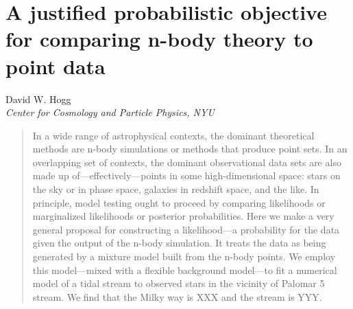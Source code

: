\documentclass[12pt,pdftex]{article}
\begin{document}
\section*{A justified probabilistic objective for comparing n-body theory to point data}

\noindent
David W. Hogg \\
\textsl{Center for Cosmology and Particle Physics, NYU}

\begin{abstract}
In a wide range of astrophysical contexts, the dominant theoretical
methods are n-body simulations or methods that produce point sets.  In
an overlapping set of contexts, the dominant observational data sets
are also made up of---effectively---points in some high-dimensional
space: stars on the sky or in phase space, galaxies in redshift space,
and the like.  In principle, model testing ought to proceed by
comparing likelihoods or marginalized likelihoods or posterior
probabilities.  Here we make a very general proposal for constructing
a likelihood---a probability for the data given the output of the
n-body simulation.  It treats the data as being generated by a mixture
model built from the n-body points.  We employ this model---mixed with
a flexible background model---to fit a numerical model of a tidal
stream to observed stars in the vicinity of Palomar 5 stream.  We find
that the Milky way is XXX and the stream is YYY.
\end{abstract}
\end{document}
